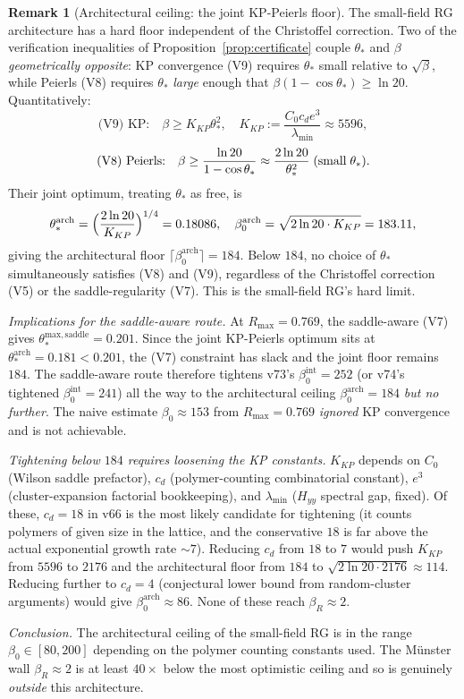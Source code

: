 \documentclass[11pt]{article}
\theoremstyle{definition}
\newtheorem{remark}[theorem]{Remark}
\begin{document}
\begin{remark}[Architectural ceiling: the joint KP-Peierls floor]
\label{rem:architectural-ceiling}
The small-field RG architecture has a hard floor independent of the
Christoffel correction.  Two of the verification inequalities of
Proposition~\ref{prop:certificate} couple $\theta_*$ and $\beta$
\emph{geometrically opposite}: KP convergence (V9) requires $\theta_*$
small relative to $\sqrt{\beta}$, while Peierls (V8) requires
$\theta_*$ \emph{large} enough that $\beta(1-\cos\theta_*)\ge\ln 20$.
Quantitatively:
\[
\text{(V9) KP:}\quad \beta\ge K_{KP}\theta_*^2,\quad K_{KP}:=\frac{C_0 c_d e^3}{\lambda_{\min}}\approx 5596,
\]
\[
\text{(V8) Peierls:}\quad \beta\ge\frac{\ln 20}{1-\cos\theta_*}\approx\frac{2\ln 20}{\theta_*^2}\;\textup{(small\;$\theta_*$)}.
\]
Their joint optimum, treating $\theta_*$ as free, is
\[
\theta_*^{\mathrm{arch}}=\Bigl(\frac{2\ln 20}{K_{KP}}\Bigr)^{1/4}=0.18086,\quad
\beta_0^{\mathrm{arch}}=\sqrt{2\ln 20\cdot K_{KP}}=183.11,
\]
giving the architectural floor
$\lceil\beta_0^{\mathrm{arch}}\rceil=184$.  Below $184$, no choice of
$\theta_*$ simultaneously satisfies (V8) and (V9), regardless of the
Christoffel correction (V5) or the saddle-regularity (V7).  This is
the small-field RG's hard limit.

\emph{Implications for the saddle-aware route.}  At $R_{\max}=0.769$,
the saddle-aware (V7) gives $\theta_*^{\mathrm{max,saddle}}=0.201$.
Since the joint KP-Peierls optimum sits at $\theta_*^{\mathrm{arch}}=0.181<0.201$,
the (V7) constraint has slack and the joint floor remains $184$.
The saddle-aware route therefore tightens v73's $\beta_0^{\mathrm{int}}=252$
\textup{(}or v74's tightened $\beta_0^{\mathrm{int}}=241$\textup{)}
all the way to the architectural ceiling $\beta_0^{\mathrm{arch}}=184$
\emph{but no further}.  The naive estimate $\beta_0\approx 153$ from
$R_{\max}=0.769$ \emph{ignored} KP convergence and is not achievable.

\emph{Tightening below $184$ requires loosening the KP constants.}
$K_{KP}$ depends on $C_0$ \textup{(}Wilson saddle prefactor\textup{)},
$c_d$ \textup{(}polymer-counting combinatorial constant\textup{)},
$e^3$ \textup{(}cluster-expansion factorial bookkeeping\textup{)},
and $\lambda_{\min}$ \textup{(}$H_{yy}$ spectral gap, fixed\textup{)}.
Of these, $c_d=18$ in v66 is the most likely candidate for tightening
\textup{(}it counts polymers of given size in the lattice, and the
conservative $18$ is far above the actual exponential growth rate
$\sim 7$\textup{)}.  Reducing $c_d$ from $18$ to $7$ would push
$K_{KP}$ from $5596$ to $2176$ and the architectural floor from $184$
to $\sqrt{2\ln 20\cdot 2176}\approx 114$.  Reducing further to
$c_d=4$ \textup{(}conjectural lower bound from random-cluster
arguments\textup{)} would give $\beta_0^{\mathrm{arch}}\approx 86$.
None of these reach $\beta_R\approx 2$.

\emph{Conclusion.}  The architectural ceiling of the small-field RG
is in the range $\beta_0\in[80,200]$ depending on the polymer counting
constants used.  The M\"unster wall $\beta_R\approx 2$ is at least
$40\times$ below the most optimistic ceiling and so is genuinely
\emph{outside} this architecture.
\end{remark}
\end{document}
